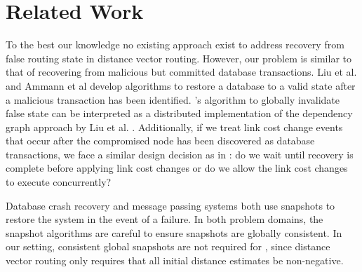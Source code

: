 \section{Related Work}
\label{sec:related-rollback}




To the best our knowledge no existing approach exist to address recovery from false routing state in distance vector routing. However,
our problem is similar to that of recovering from malicious but committed database transactions. Liu et al.
\cite{Liu98} and Ammann et al \cite{Liu00} develop algorithms to restore a database to a valid state after a malicious transaction has been identified. 
\purges's algorithm to globally invalidate
false state can be interpreted as a distributed implementation of the dependency graph approach by Liu et al. \cite{Liu00}.  Additionally,
if we treat link cost change events that occur after the compromised node has been discovered as database transactions, we face a similar design decision as in  \cite{Liu98}: 
do we wait until recovery is complete before applying link cost changes or do we allow the link cost changes to execute concurrently?


Database crash recovery \cite{Mohan92} and message passing systems \cite{Arini} both use snapshots to restore the system in the event of a failure. In both 
problem domains, the snapshot algorithms are careful to ensure snapshots are globally consistent. 
In our setting, consistent global snapshots are not required for \cprs, since  
distance vector routing only requires that all initial distance estimates be non-negative.



